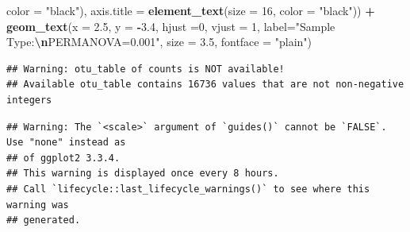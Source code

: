 \documentclass[
]{article}
\newenvironment{Shaded}{\begin{snugshade}}{\end{snugshade}}
\newcommand{\AttributeTok}[1]{\textcolor[rgb]{0.13,0.29,0.53}{#1}}
\newcommand{\DecValTok}[1]{\textcolor[rgb]{0.00,0.00,0.81}{#1}}
\newcommand{\FloatTok}[1]{\textcolor[rgb]{0.00,0.00,0.81}{#1}}
\newcommand{\FunctionTok}[1]{\textcolor[rgb]{0.13,0.29,0.53}{\textbf{#1}}}
\newcommand{\NormalTok}[1]{#1}
\newcommand{\SpecialCharTok}[1]{\textcolor[rgb]{0.81,0.36,0.00}{\textbf{#1}}}
\newcommand{\StringTok}[1]{\textcolor[rgb]{0.31,0.60,0.02}{#1}}
\begin{document}
\begin{Shaded}
\begin{Highlighting}[]
                                 \AttributeTok{color =} \StringTok{"black"}\NormalTok{),}
        \AttributeTok{axis.title =} \FunctionTok{element\_text}\NormalTok{(}\AttributeTok{size =} \DecValTok{16}\NormalTok{,}
                                  \AttributeTok{color =} \StringTok{"black"}\NormalTok{)) }\SpecialCharTok{+}
  \FunctionTok{geom\_text}\NormalTok{(}\AttributeTok{x =} \FloatTok{2.5}\NormalTok{, }
            \AttributeTok{y =} \SpecialCharTok{{-}}\FloatTok{3.4}\NormalTok{, }
            \AttributeTok{hjust =}\DecValTok{0}\NormalTok{,}
            \AttributeTok{vjust =} \DecValTok{1}\NormalTok{,}
            \AttributeTok{label=}\StringTok{"Sample Type:}\SpecialCharTok{\textbackslash{}n}\StringTok{PERMANOVA=0.001"}\NormalTok{,}
            \AttributeTok{size =} \FloatTok{3.5}\NormalTok{,}
            \AttributeTok{fontface =} \StringTok{"plain"}\NormalTok{)}
\end{Highlighting}
\end{Shaded}

\begin{verbatim}
## Warning: otu_table of counts is NOT available!
## Available otu_table contains 16736 values that are not non-negative integers
\end{verbatim}

\begin{verbatim}
## Warning: The `<scale>` argument of `guides()` cannot be `FALSE`. Use "none" instead as
## of ggplot2 3.3.4.
## This warning is displayed once every 8 hours.
## Call `lifecycle::last_lifecycle_warnings()` to see where this warning was
## generated.
\end{verbatim}
\end{document}
